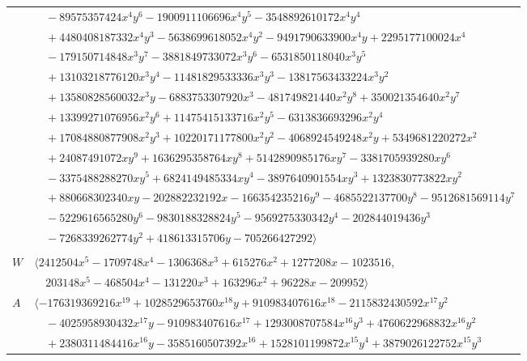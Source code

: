 \documentclass[11pt]{article}
\begin{document}
\begin{longtable}{@{}ll@{}}
 & $\quad -89575357424x^{4}y^{6}-1900911106696x^{4}y^{5}-3548892610172x^{4}y^{4}$\\
 & $\quad +4480408187332x^{4}y^{3}-5638699618052x^{4}y^{2}-9491790633900x^{4}y+2295177100024x^{4}$\\
 & $\quad -179150714848x^{3}y^{7}-3881849733072x^{3}y^{6}-6531850118040x^{3}y^{5}$\\
 & $\quad +13103218776120x^{3}y^{4}-11481829533336x^{3}y^{3}-13817563433224x^{3}y^{2}$\\
 & $\quad +13580828560032x^{3}y-6883753307920x^{3}-481749821440x^{2}y^{8}+350021354640x^{2}y^{7}$\\
 & $\quad +13399271076956x^{2}y^{6}+11475415133716x^{2}y^{5}-6313836693296x^{2}y^{4}$\\
 & $\quad +17084880877908x^{2}y^{3}+10220171177800x^{2}y^{2}-4068924549248x^{2}y+5349681220272x^{2}$\\
 & $\quad +24087491072xy^{9}+1636295358764xy^{8}+5142890985176xy^{7}-3381705939280xy^{6}$\\
 & $\quad -3375488288270xy^{5}+6824149485334xy^{4}-3897640901554xy^{3}+1323830773822xy^{2}$\\
 & $\quad +880668302340xy-202882232192x-166354235216y^{9}-4685522137700y^{8}-9512681569114y^{7}$\\
 & $\quad -5229616565280y^{6}-9830188328824y^{5}-9569275330342y^{4}-202844019436y^{3}$\\
 & $\quad -7268339262774y^{2}+418613315706y-705266427292\rangle$\\
\addlinespace[2pt]
\multicolumn{2}{@{}p{0.97\textwidth}@{}}{$i=56$, $D_i=3888$, $\rho_{ij}$: $7{:}1, \allowbreak 8{:}2, \allowbreak 9{:}1, \allowbreak 18{:}1, \allowbreak 23{:}1, \allowbreak 26{:}2, \allowbreak 37{:}1, \allowbreak 38{:}2, \allowbreak 39{:}1, \allowbreak 40{:}1, \allowbreak 47{:}1, \allowbreak 50{:}2, \allowbreak 52{:}2$}\\
$W$ & $\langle 2412504x^{5}-1709748x^{4}-1306368x^{3}+615276x^{2}+1277208x-1023516,$\\
 & $\quad 203148x^{5}-468504x^{4}-131220x^{3}+163296x^{2}+96228x-209952\rangle$\\
$A$ & $\langle -176319369216x^{19}+1028529653760x^{18}y+910983407616x^{18}-2115832430592x^{17}y^{2}$\\
 & $\quad -4025958930432x^{17}y-910983407616x^{17}+1293008707584x^{16}y^{3}+4760622968832x^{16}y^{2}$\\
 & $\quad +2380311484416x^{16}y-3585160507392x^{16}+1528101199872x^{15}y^{4}+3879026122752x^{15}y^{3}$\\

\end{longtable}
\end{document}
